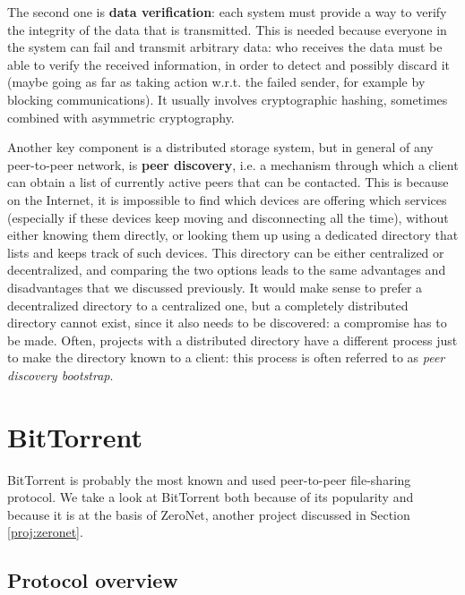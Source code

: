 \documentclass[mscthesis]{usiinfthesis}
\begin{document}
The second one is \textbf{data verification}: each system must provide a way to verify the integrity of the data that is transmitted. This is needed because everyone in the system can fail and transmit arbitrary data: who receives the data must be able to verify the received information, in order to detect and possibly discard it (maybe going as far as taking action w.r.t. the failed sender, for example by blocking communications). It usually involves cryptographic hashing, sometimes combined with asymmetric cryptography.

Another key component is a distributed storage system, but in general of any peer-to-peer network, is \textbf{peer discovery}, i.e. a mechanism through which a client can obtain a list of currently active peers that can be contacted. This is because on the Internet, it is impossible to find which devices are offering which services (especially if these devices keep moving and disconnecting all the time), without either knowing them directly, or looking them up using a dedicated directory that lists and keeps track of such devices. This directory can be either centralized or decentralized, and comparing the two options leads to the same advantages and disadvantages that we discussed previously. It would make sense to prefer a decentralized directory to a centralized one, but a completely distributed directory cannot exist, since it also needs to be discovered: a compromise has to be made. Often, projects with a distributed directory have a different process just to make the directory known to a client: this process is often referred to as \textit{peer discovery bootstrap}.


\section{BitTorrent}\label{proj:bittorrent}

BitTorrent is probably the most known and used peer-to-peer file-sharing protocol. We take a look at BitTorrent both because of its popularity and because it is at the basis of ZeroNet, another project discussed in Section \ref{proj:zeronet}.

\subsection{Protocol overview}
\end{document}

